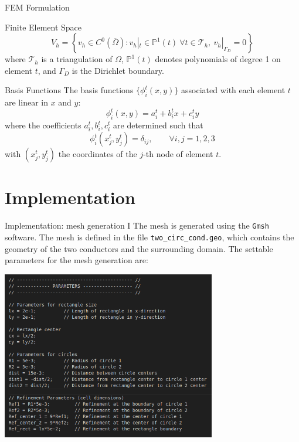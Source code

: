 \documentclass[aspectratio=54,xcolor=dvipsnames]{beamer}
\begin{document}
\begin{frame}{FEM Formulation}
    \begin{block}{Finite Element Space}
    \[
    V_h = \left\{ v_h \in C^0(\overline{\Omega}) : v_h|_t \in \mathbb{P}^1(t)\ \forall t \in \mathcal{T}_h,\ v_h|_{\Gamma_D} = 0 \right\}
    \]
    where $\mathcal{T}_h$ is a triangulation of $\Omega$, $\mathbb{P}^1(t)$ denotes polynomials of degree 1 on element $t$, and $\Gamma_D$ is the Dirichlet boundary.
    \end{block}
    \begin{block}{Basis Functions}
    The basis functions $\{\phi_i^t(x, y)\}$ associated with each element $t$ are linear in $x$ and $y$:
    \[
    \phi_i^t(x, y) = a_i^t + b_i^t x + c_i^t y
    \]
    where the coefficients $a_i^t, b_i^t, c_i^t$ are determined such that
    \[
    \phi_i^t(x_j^t, y_j^t) = \delta_{ij}, \qquad \forall i, j = 1,2,3
    \]
    with $(x_j^t, y_j^t)$ the coordinates of the $j$-th node of element $t$.
    \end{block}
    
\end{frame}

\section{Implementation}
\begin{frame}{Implementation: mesh generation I}
    The mesh is generated using the \texttt{Gmsh} software. The mesh is defined in the file \texttt{two\_circ\_cond.geo}, which contains the geometry of the two conductors and the surrounding domain. The settable parameters for the mesh generation are:
    \begin{center}
         \includegraphics[width=0.7\textwidth]{Images/Gmsh_parameters.png}
    \end{center}
\end{frame}
\end{document}
